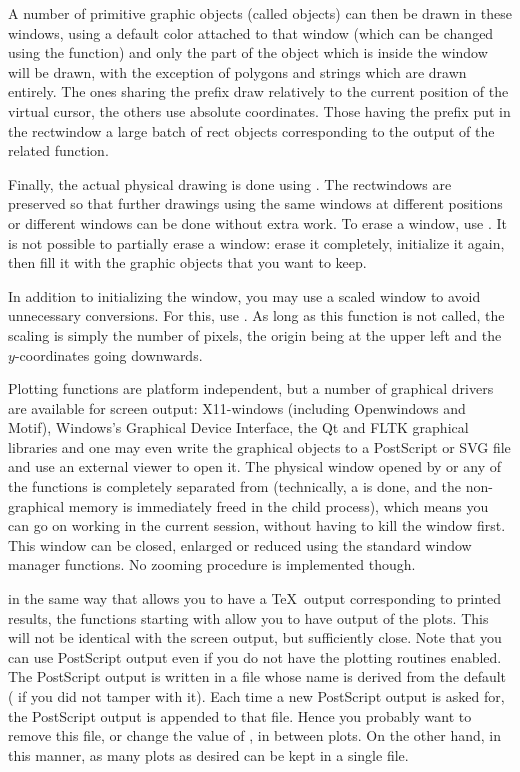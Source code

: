 A number of primitive graphic objects (called  objects) can then
be drawn in these windows, using a default color attached to that window
(which can be changed using the  function) and only the part
of the object which is inside the window will be drawn, with the exception of
polygons and strings which are drawn entirely. The ones sharing the prefix
 draw relatively to the current position of the virtual cursor,
the others use absolute coordinates. Those having the prefix 
put in the rectwindow a large batch of rect objects corresponding to the
output of the related  function.

   Finally, the actual physical drawing is done using . The
rectwindows are preserved so that further drawings using the same windows at
different positions or different windows can be done without extra work. To
erase a window, use . It is not possible to partially erase a
window: erase it completely, initialize it again, then fill it with the
graphic objects that you want to keep.

   In addition to initializing the window, you may use a scaled window to
avoid unnecessary conversions. For this, use . As long as this
function is not called, the scaling is simply the number of pixels, the
origin being at the upper left and the $y$-coordinates going downwards.

   Plotting functions are platform independent, but a number of graphical
drivers are available for screen output: X11-windows (including
Openwindows and Motif), Windows's Graphical Device Interface, the Qt and
FLTK graphical libraries and one may even write the graphical objects to a
PostScript or SVG file and use an external viewer to open it. The physical
window opened by  or any of the  functions is
completely separated from  (technically, a  is done, and
the non-graphical memory is immediately freed in the child process), which
means you can go on working in the current  session, without having
to kill the window first. This window can be closed, enlarged or reduced
using the standard window manager functions. No zooming procedure is
implemented though.

 in the same way that  allows you to have a \TeX\ output
corresponding to printed results, the functions starting with  allow
you to have  output of the plots. This will not be identical
with the screen output, but sufficiently close. Note that you can use
PostScript output even if you do not have the plotting routines enabled. The
PostScript output is written in a file whose name is derived from the
 default ( if you did not tamper with it). Each
time a new PostScript output is asked for, the PostScript output is appended
to that file. Hence you probably want to remove this file, or change the
value of , in between plots. On the other hand, in this manner,
as many plots as desired can be kept in a single file. \smallskip


